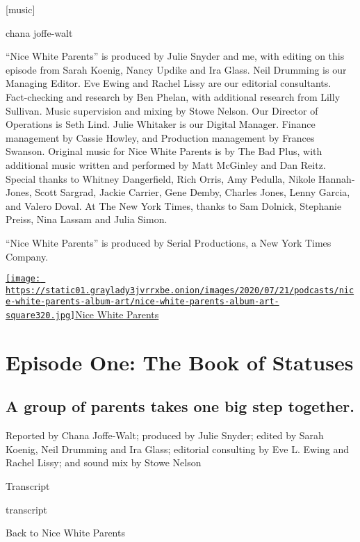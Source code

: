 {[}music{]}

chana joffe-walt

``Nice White Parents'' is produced by Julie Snyder and me, with editing
on this episode from Sarah Koenig, Nancy Updike and Ira Glass. Neil
Drumming is our Managing Editor. Eve Ewing and Rachel Lissy are our
editorial consultants. Fact-checking and research by Ben Phelan, with
additional research from Lilly Sullivan. Music supervision and mixing by
Stowe Nelson. Our Director of Operations is Seth Lind. Julie Whitaker is
our Digital Manager. Finance management by Cassie Howley, and Production
management by Frances Swanson. Original music for Nice White Parents is
by The Bad Plus, with additional music written and performed by Matt
McGinley and Dan Reitz. Special thanks to Whitney Dangerfield, Rich
Orris, Amy Pedulla, Nikole Hannah-Jones, Scott Sargrad, Jackie Carrier,
Gene Demby, Charles Jones, Lenny Garcia, and Valero Doval. At The New
York Times, thanks to Sam Dolnick, Stephanie Preiss, Nina Lassam and
Julia Simon.

``Nice White Parents'' is produced by Serial Productions, a New York
Times Company.

\href{https://www.nytimes3xbfgragh.onion/column/nice-white-parents}{\texttt{[image: https://static01.graylady3jvrrxbe.onion/images/2020/07/21/podcasts/nice-white-parents-album-art/nice-white-parents-album-art-square320.jpg]}Nice
White Parents}

\hypertarget{episode-one-the-book-of-statuses-1}{%
\section{Episode One: The Book of
Statuses}\label{episode-one-the-book-of-statuses-1}}

\hypertarget{a-group-of-parents-takes-one-big-step-together-1}{%
\subsection{A group of parents takes one big step
together.}\label{a-group-of-parents-takes-one-big-step-together-1}}

Reported by Chana Joffe-Walt; produced by Julie Snyder; edited by Sarah
Koenig, Neil Drumming and Ira Glass; editorial consulting by Eve L.
Ewing and Rachel Lissy; and sound mix by Stowe Nelson

Transcript

transcript

Back to Nice White Parents

